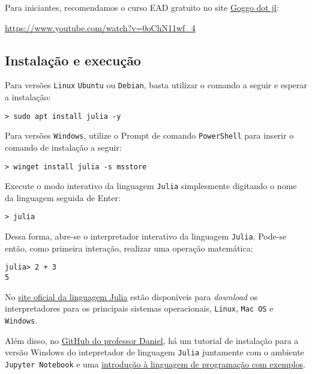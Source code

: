 Para iniciantes, recomendamos o curso EAD gratuito no site \href{https://www.youtube.com/watch?v=0oChN11wf_4}{Goggo dot jl}:
\begin{center}
  \url{https://www.youtube.com/watch?v=0oChN11wf_4}
\end{center}

\subsection{Instalação e execução}

Para versões \verb+Linux+ \verb+Ubuntu+ ou \verb+Debian+, basta utilizar o comando a seguir e esperar a instalação:
\begin{lstlisting}[style=c]
> sudo apt install julia -y
\end{lstlisting}

Para versões \verb+Windows+, utilize o Prompt de comando \verb+PowerShell+ para inserir o comando de instalação a seguir:
\begin{lstlisting}[style=c]
> winget install julia -s msstore
\end{lstlisting}

Execute o modo interativo da linguagem \verb+Julia+ simplesmente digitando o nome da linguagem seguida de Enter:

\begin{lstlisting}[style=c]
> julia
\end{lstlisting}

Dessa forma, abre-se o interpretador interativo da linguagem \verb+Julia+. Pode-se então, como primeira interação, realizar uma operação matemática:

\begin{lstlisting}
julia> 2 + 3
5
\end{lstlisting}

No \href{https://julialang.org/downloads/}{site oficial da linguagem Julia} estão disponíveis para {\it download} os interpretadores para os principais sistemas operacionais, \verb+Linux+, \verb+Mac OS+ e \verb+Windows+. 

Além disso, no \href{https://github.com/Daniel-C-Fernandes/Numerico/tree/main}{GitHub do professor Daniel}, há um tutorial de instalação para a versão Windows do intepretador de linguagem \verb+Julia+ juntamente com o ambiente \verb+Jupyter Notebook+ e uma \href{https://github.com/Daniel-C-Fernandes/Numerico/blob/main/Mini-curso-Julia.ipynb}{introdução à linguagem de programação com exemplos}.

